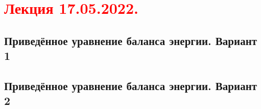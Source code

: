 \documentclass[main.tex]{subfiles}
\begin{document}
\section{\textcolor{red}{Лекция 17.05.2022.}}

\subsection{Приведённое уравнение баланса энергии. Вариант 1}

\subsection{Приведённое уравнение баланса энергии. Вариант 2}
\end{document}
